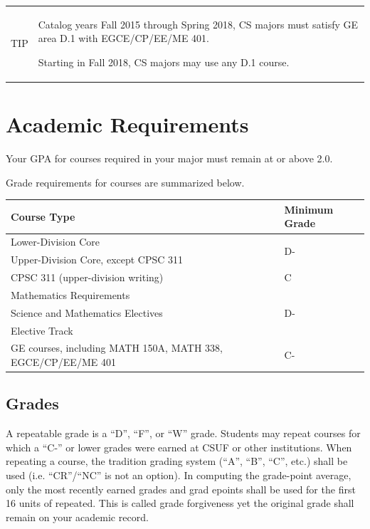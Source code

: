 \documentclass{book}
\newenvironment{tip}{
  \tcolorbox \begin{tabular}{m{.5in} m{5.25in}}
    \Large{TIP} &
}{
  \end{tabular} \endtcolorbox
}
\begin{document}

\begin{tip}
 Catalog years Fall 2015 through Spring 2018, CS majors must satisfy
 GE area D.1 with EGCE/CP/EE/ME 401.

 Starting in Fall 2018, CS majors may use any D.1 course.
\end{tip}

\section{Academic Requirements}

Your GPA for courses required in your major must remain at or above 2.0.

Grade requirements for courses are summarized below.

\begin{center}
\begin{tabular}{|p{3in}|l|} \hline
  \textbf{Course Type} & \textbf{Minimum Grade} \\ \hline
  Lower-Division Core & \multirow{2}{*}{D-} \\
  Upper-Division Core, except CPSC 311 & \\ \hline
  CPSC 311 (upper-division writing) & C \\ \hline
  Mathematics Requirements & \multirow{3}{*}{D-} \\
  Science and Mathematics Electives & \\
  Elective Track & \\ \hline
  GE courses, including MATH 150A, MATH 338, EGCE/CP/EE/ME 401 & \multirow{2}{*}{C-} \\ \hline
\end{tabular}
\end{center}

\subsection{Grades}
\label{subsection:grades}
A repeatable grade is a ``D'', ``F'', or ``W'' grade. Students may
repeat courses for which a ``C-'' or lower grades were earned at CSUF
or other institutions. When repeating a course, the tradition grading
system (``A'', ``B'', ``C'', etc.) shall be used (i.e. ``CR''/``NC''
is not an option). In computing the grade-point average, only the most
recently earned grades and grad epoints shall be used for the first 16
units of repeated. This is called grade forgiveness yet the original
grade shall remain on your academic record.
\end{document}
